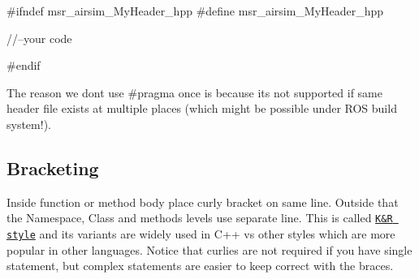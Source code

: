 \begin{DoxyCode}
#ifndef msr\_airsim\_MyHeader\_hpp
#define msr\_airsim\_MyHeader\_hpp

//--your code

#endif
\end{DoxyCode}


The reason we don\textquotesingle{}t use \#pragma once is because it\textquotesingle{}s not supported if same header file exists at multiple places (which might be possible under R\+OS build system!).\hypertarget{md_coding_docs_coding_guidelines_autotoc_md9}{}\subsection{Bracketing}\label{md_coding_docs_coding_guidelines_autotoc_md9}
Inside function or method body place curly bracket on same line. Outside that the Namespace, Class and methods levels use separate line. This is called \href{https://en.wikipedia.org/wiki/Indent_style#K.26R_style}{\tt K\&R style} and its variants are widely used in C++ vs other styles which are more popular in other languages. Notice that curlies are not required if you have single statement, but complex statements are easier to keep correct with the braces.


